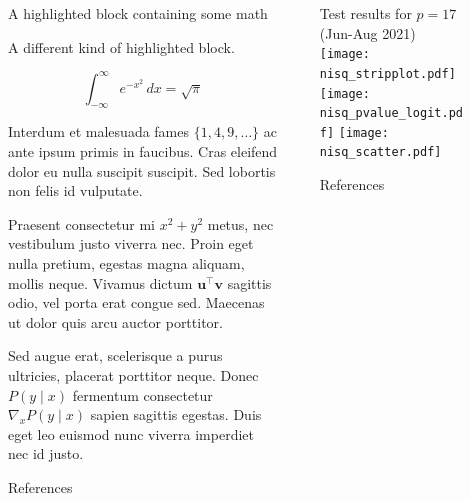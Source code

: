 \documentclass[final]{beamer}
\newlength{\sepwidth}
\newlength{\colwidth}
\newcommand{\separatorcolumn}{\begin{column}{\sepwidth}\end{column}}
\begin{document}
\begin{frame}[t]
\begin{columns}[t]
\separatorcolumn

\begin{column}{\colwidth}

  \begin{exampleblock}{A highlighted block containing some math}

    A different kind of highlighted block.

    $$
    \int_{-\infty}^{\infty} e^{-x^2}\,dx = \sqrt{\pi}
    $$

    Interdum et malesuada fames $\{1, 4, 9, \ldots\}$ ac ante ipsum primis in
    faucibus. Cras eleifend dolor eu nulla suscipit suscipit. Sed lobortis non
    felis id vulputate.


    Praesent consectetur mi $x^2 + y^2$ metus, nec vestibulum justo viverra
    nec. Proin eget nulla pretium, egestas magna aliquam, mollis neque. Vivamus
    dictum $\mathbf{u}^\intercal\mathbf{v}$ sagittis odio, vel porta erat
    congue sed. Maecenas ut dolor quis arcu auctor porttitor.


    Sed augue erat, scelerisque a purus ultricies, placerat porttitor neque.
    Donec $P(y \mid x)$ fermentum consectetur $\nabla_x P(y \mid x)$ sapien
    sagittis egestas. Duis eget leo euismod nunc viverra imperdiet nec id
    justo.

  \end{exampleblock}

  \begin{block}{References}

    \nocite{*}
    \footnotesize{}

  \end{block}

\end{column}
\separatorcolumn

\begin{column}{\colwidth}
  \begin{block}{Test results for $p=17$ \hspace{1ex}  (Jun-Aug 2021)}
    \texttt{[image: nisq\_stripplot.pdf]}
    \texttt{[image: nisq\_pvalue\_logit.pdf]}
    \texttt{[image: nisq\_scatter.pdf]}

  \end{block}


  \begin{block}{References}

    \nocite{*}
    \footnotesize{}

  \end{block}

\end{column}

\separatorcolumn
\end{columns}
\end{frame}
\end{document}
